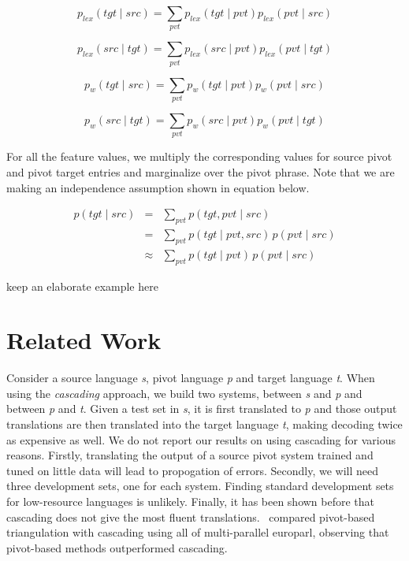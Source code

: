 		\begin{equation*}
                 p_{lex}(tgt \mid src) = \sum_{pvt} p_{lex}(tgt \mid pvt) p_{lex}(pvt \mid src)
        \end{equation*}

        \begin{equation*}
        	p_{lex}(src \mid tgt) = \sum_{pvt} p_{lex}(src \mid pvt) p_{lex}(pvt \mid tgt)
        \end{equation*}

         \begin{equation*}
        	p_w(tgt \mid src) = \sum_{pvt} p_w(tgt \mid pvt) p_w(pvt \mid src)
        \end{equation*}

        \begin{equation*}
        	p_w(src \mid tgt) = \sum_{pvt} p_w(src \mid pvt) p_w(pvt \mid tgt)
        \end{equation*}

        For all the feature values, we multiply the corresponding values for source pivot and pivot target entries and marginalize over the pivot phrase. Note that we are making an independence assumption shown in equation below. 

         \begin{eqnarray*} \label{eq:independence}
                p(tgt \mid src)&=&\sum_{pvt}{p(tgt, pvt \mid src)}\\
                &=& \sum_{pvt}{p(tgt \mid pvt, src)\,p(pvt \mid src)}\\
                &\approx& \sum_{pvt}{p(tgt \mid pvt)\,p(pvt \mid src)}
        \end{eqnarray*}


\alert{keep an elaborate example here}



\section{Related Work}
 Consider a source language \emph{s}, pivot language \emph{p} and target language \emph{t}. When using the \emph{cascading} approach, we build two systems, between \emph{s} and \emph{p} and between \emph{p} and \emph{t}. Given a test set in \emph{s}, it is first translated to \emph{p} and those output translations are then translated into the target language \emph{t}, making decoding twice as expensive as well. We do not report our results on using cascading for various reasons. Firstly, translating the output of a source pivot system trained and tuned on little data will lead to propogation of errors. Secondly, we will need three development sets, one for each system. Finding standard development sets for low-resource languages is unlikely. Finally, it has been shown before that cascading does not give the most fluent translations.~\cite{Utiyama:07} compared pivot-based triangulation with cascading using all of multi-parallel europarl, observing that pivot-based methods outperformed cascading.

